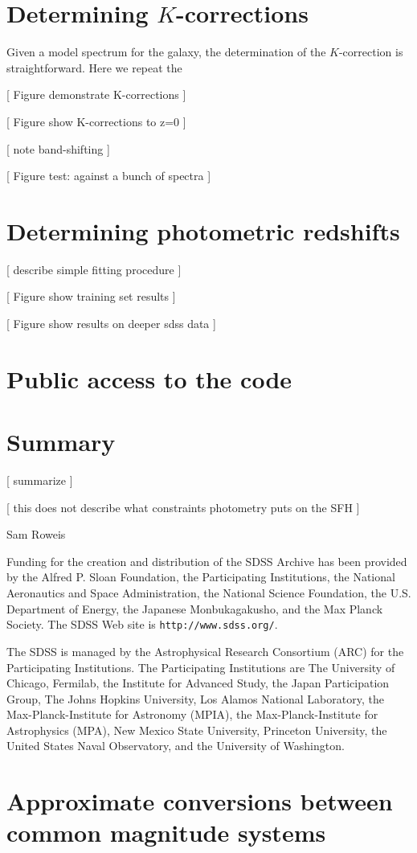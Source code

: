 \documentclass[10pt,preprint]{aastex}
\begin{document}
\section{Determining $K$-corrections} 
\label{kcorrect}

Given a model spectrum for the galaxy, the determination of the
$K$-correction is straightforward. Here we repeat the 

[ Figure demonstrate K-corrections ]

[ Figure show K-corrections to z=0 ]

[ note band-shifting ]

[ Figure test: against a bunch of spectra ]

\section{Determining photometric redshifts}
\label{kphotoz}

[ describe simple fitting procedure ]

[ Figure show training set results ]

[ Figure show results on deeper sdss data ] 

\section{Public access to the code}

\section{Summary}
\label{conclusions}

[ summarize ]

[ this does not describe what constraints photometry puts on the SFH ]

\acknowledgments

Sam Roweis

Funding for the creation and distribution of the SDSS Archive has been
provided by the Alfred P. Sloan Foundation, the Participating
Institutions, the National Aeronautics and Space Administration, the
National Science Foundation, the U.S. Department of Energy, the
Japanese Monbukagakusho, and the Max Planck Society. The SDSS Web site
is {\tt http://www.sdss.org/}.

The SDSS is managed by the Astrophysical Research Consortium (ARC) for
the Participating Institutions. The Participating Institutions are The
University of Chicago, Fermilab, the Institute for Advanced Study, the
Japan Participation Group, The Johns Hopkins University, Los Alamos
National Laboratory, the Max-Planck-Institute for Astronomy (MPIA),
the Max-Planck-Institute for Astrophysics (MPA), New Mexico State
University, Princeton University, the United States Naval Observatory,
and the University of Washington.
 



\appendix

\section{Approximate conversions between common magnitude systems}

\newpage

%


\end{document}

